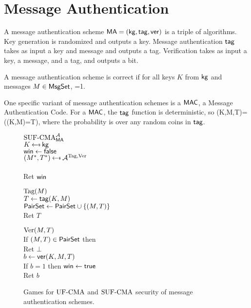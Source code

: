 \section{Message Authentication}
\label{sec:msgauth}

A message authentication scheme $\mathsf{MA} = ({\sf kg},\mathsf{tag},\mathsf{ver})$ is a triple of
algorithms. Key generation is randomized and outputs a key. Message
authentication $\mathsf{tag}$ takes as input a key and message and outputs a tag.
Verification takes as input a key, a message, and a tag, and outputs a bit. 

A message authentication scheme is correct if for all keys $K$ from ${\sf kg}$ and messages $M\in \textsf{MsgSet}$, 
\bnm
{}=1\;.
\enm

One specific variant of message authentication schemes is a $\mbox{\textsf{MAC}}$, a Message Authentication Code. For a $\mathsf{MAC}$, the $\mathsf{tag}$ function is deterministic, so 
\bnm
\ver(K,M,T)=(\mtag(K,M)=T)\;,
\enm
where the probability is over any random coins in $\mathsf{tag}$.
\begin{figure}[t]
	\centering
	{
	\underline{$\textnormal{SUF-CMA}_{\mathsf{MA}}^{\mathcal A}$}\\[1pt]
	$K \getsr \kg$\\
	$\mathsf{win}\gets\mathsf{false}$\\
	$(M^*,T^*) \getsr \advA^{\TagOracle,\VerOracle}$\\
	\\
	Ret $\mathsf{win}$\medskip
	}{
	\underline{$\textnormal{Tag}(M)$}\\
	$T \gets \mathsf{tag}(K,M)$\\
	$\textsf{PairSet} \gets \textsf{PairSet} \cup \{(M,T)\}$\\
	Ret $T$\medskip 
	
	\underline{$\textnormal{Ver}(M,T)$}\\
	If $(M,T) \in \textsf{PairSet}$ then \\
	\myInd Ret $\bot$\\
	$b \gets \mathsf{ver}(K,M,T)$\\
	If $b = 1$ then $\mathsf{win}\gets\mathsf{true}$\\
	Ret $b$
	}	
	\caption{Games for $\textnormal{UF-CMA}$ and $\textnormal{SUF-CMA}$ security of message authentication schemes.}
	\label{fig:game-ufcma}
\end{figure}

